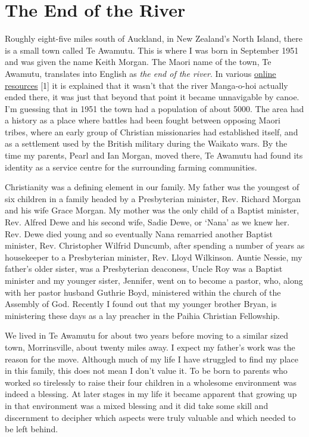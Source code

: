 \chapter{The End of the River}

Roughly eight-five miles south of Auckland, in New Zealand's North
Island, there is a small town called Te Awamutu. This is where I was
born in September 1951 and was given the name Keith Morgan. The Maori
name of the town, Te Awamutu, translates into English as \emph{the end
of the river}. In various
\href{https://www.teawamutu.nz/info/history/early.html}{\underline{online
resources}} {[}1{]} it is explained that it wasn't that the river
Manga-o-hoi actually ended there, it was just that beyond that point it
became unnavigable by canoe. I'm guessing that in 1951 the town had a
population of about 5000. The area had a history as a place where
battles had been fought between opposing Maori tribes, where an early
group of Christian missionaries had established itself, and as a
settlement used by the British military during the Waikato wars. By the
time my parents, Pearl and Ian Morgan, moved there, Te Awamutu had found
its identity as a service centre for the surrounding farming
communities.

Christianity was a defining element in our family. My father was the
youngest of six children in a family headed by a Presbyterian minister,
Rev. Richard Morgan and his wife Grace Morgan. My mother was the only
child of a Baptist minister, Rev. Alfred Dewe and his second wife, Sadie
Dewe, or `Nana' as we knew her. Rev. Dewe died young and so eventually
Nana remarried another Baptist minister, Rev. Christopher Wilfrid
Duncumb, after spending a number of years as housekeeper to a
Presbyterian minister, Rev. Lloyd Wilkinson. Auntie Nessie, my father's
older sister, was a Presbyterian deaconess, Uncle Roy was a Baptist
minister and my younger sister, Jennifer, went on to become a pastor,
who, along with her pastor husband Guthrie Boyd, ministered within the
church of the Assembly of God. Recently I found out that my younger
brother Bryan, is ministering these days as a lay preacher in the Paihia
Christian Fellowship.

We lived in Te Awamutu for about two years before moving to a similar
sized town, Morrinsville, about twenty miles away. I expect my father's
work was the reason for the move. Although much of my life I have
struggled to find my place in this family, this does not mean I don't
value it. To be born to parents who worked so tirelessly to raise their
four children in a wholesome environment was indeed a blessing. At later
stages in my life it became apparent that growing up in that environment
was a mixed blessing and it did take some skill and discernment to
decipher which aspects were truly valuable and which needed to be left
behind.


